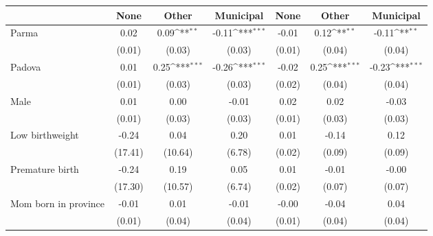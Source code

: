 {
\def\sym#1{\ifmmode^{#1}\else\(^{#1}\)\fi}
\begin{tabular}{l*{6}{c}}
\toprule
                    &\multicolumn{1}{c}{None}&\multicolumn{1}{c}{Other}&\multicolumn{1}{c}{Municipal}&\multicolumn{1}{c}{None}&\multicolumn{1}{c}{Other}&\multicolumn{1}{c}{Municipal}\\
\midrule
Parma         &        0.02         &        0.09\sym{**} &       -0.11\sym{***}&       -0.01         &        0.12\sym{**} &       -0.11\sym{**} \\
                    &      (0.01)         &      (0.03)         &      (0.03)         &      (0.01)         &      (0.04)         &      (0.04)         \\
\addlinespace
Padova        &        0.01         &        0.25\sym{***}&       -0.26\sym{***}&       -0.02         &        0.25\sym{***}&       -0.23\sym{***}\\
                    &      (0.01)         &      (0.03)         &      (0.03)         &      (0.02)         &      (0.04)         &      (0.04)         \\
\addlinespace
Male                &        0.01         &        0.00         &       -0.01         &        0.02         &        0.02         &       -0.03         \\
                    &      (0.01)         &      (0.03)         &      (0.03)         &      (0.01)         &      (0.03)         &      (0.03)         \\
\addlinespace
Low birthweight     &       -0.24         &        0.04         &        0.20         &        0.01         &       -0.14         &        0.12         \\
                    &     (17.41)         &     (10.64)         &      (6.78)         &      (0.02)         &      (0.09)         &      (0.09)         \\
\addlinespace
Premature birth     &       -0.24         &        0.19         &        0.05         &        0.01         &       -0.01         &       -0.00         \\
                    &     (17.30)         &     (10.57)         &      (6.74)         &      (0.02)         &      (0.07)         &      (0.07)         \\
\addlinespace
Mom born in province&       -0.01         &        0.01         &       -0.01         &       -0.00         &       -0.04         &        0.04         \\
                    &      (0.01)         &      (0.04)         &      (0.04)         &      (0.01)         &      (0.04)         &      (0.04)         \\

\end{tabular}}
